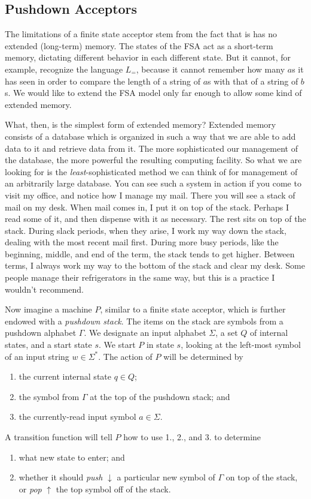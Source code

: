 \documentclass{article}
\begin{document}
\subsection{Pushdown Acceptors} %


The limitations of a finite state acceptor stem from the fact that is has no extended (long-term) memory. The states of the FSA act as a short-term memory, dictating different behavior in each different state. But it cannot, for example, recognize the language $L_=$, because it cannot remember how many $a$s it has seen in order to compare the length of a string of $a$s with that of a string of $b$s. We would like to extend the FSA model only far enough to allow some kind of extended memory.

What, then, is the simplest form of extended memory? Extended memory consists of a database which is organized in such a way that we are able to add data to it and retrieve data from it. The more sophisticated our management of the database, the more powerful the resulting computing facility. So what we are looking for is the \emph{least}-sophisticated method we can think of for management of an arbitrarily large database. You can see such a system in action if you come to visit my office, and notice how I manage my mail. There you will see a stack of mail on my desk. When mail comes in, I put it on top of the stack. Perhaps I read some of it, and then dispense with it as necessary. The rest sits on top of the stack. During slack periods, when they arise, I work my way down the stack, dealing with the most recent mail first. During more busy periods, like the beginning, middle, and end of the term, the stack tends to get higher. Between terms, I always work my way to the bottom of the stack and clear my desk. Some people manage their refrigerators in the same way, but this is a practice I wouldn't recommend.

Now imagine a machine $P$, similar to a finite state acceptor, which is further endowed with a \emph{pushdown stack}. The items on the stack are symbols from a pushdown alphabet $\Gamma$. We designate an input alphabet $\Sigma$, a set $Q$ of internal states, and a start state $s$. We start $P$ in state $s$, looking at the left-most symbol of an input string $w \in \Sigma^*$. The action of $P$ will be determined by
\begin{enumerate}
  \item the current internal state $q \in Q$;
  \item the symbol from $\Gamma$ at the top of the pushdown stack; and
  \item the currently-read input symbol $a \in \Sigma$.
\end{enumerate}
A transition function will tell $P$ how to use 1., 2., and 3. to determine
\begin{enumerate}
  \item what new state to enter; and
  \item whether it should \emph{push} $\downarrow$ a particular new symbol of $\Gamma$ on top of the stack, or \emph{pop} $\uparrow$ the top symbol off of the stack.
\end{enumerate}
\end{document}
